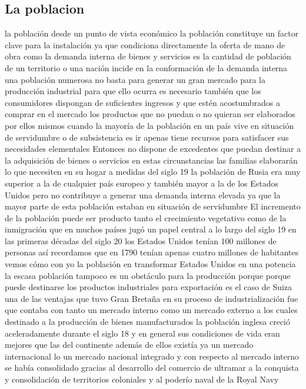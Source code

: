 \documentclass[12pt]{book}
\begin{document}
\subsection{La poblacion}
la población desde un punto de vista económico la población constituye un factor clave para la instalación ya que condiciona directamente la oferta de mano de obra como la demanda interna de bienes y servicios es la cantidad de población de un territorio o una nación incide en la conformación de la demanda interna una población numerosa no basta para generar un gran mercado para la producción industrial para que ello ocurra es necesario también que los consumidores dispongan de suficientes ingresos y que estén acostumbrados a comprar en el mercado los productos que no puedan o no quieran ser elaborados por ellos mismos cuando la mayoría de la población en un país vive en situación de servidumbre o de subsistencia es ir apenas tiene recursos para satisfacer sus necesidades elementales Entonces no dispone de excedentes que puedan destinar a la adquisición de bienes o servicios en estas circunstancias las familias elaborarán lo que necesiten en su hogar a medidas del siglo 19 la población de Rusia era muy superior a la de cualquier país europeo y también mayor a la de los Estados Unidos pero no contribuye a generar una demanda interna elevada ya que la mayor parte de esta población estaban en situación de servidumbre El incremento de la población puede ser producto tanto el crecimiento vegetativo como de la inmigración que en muchos países jugó un papel central a lo largo del siglo 19 en las primeras décadas del siglo 20 los Estados Unidos tenían 100 millones de personas así recordamos que en 1790 tenían apenas cuatro millones de habitantes vemos cómo con yo la población en transformar Estados Unidos en una potencia la escasa población tampoco es un obstáculo para la producción porque porque puede destinarse los productos industriales para exportación es el caso de Suiza una de las ventajas que tuvo Gran Bretaña en su proceso de industrialización fue que contaba con tanto un mercado interno como un mercado externo a los cuales destinado a la producción de bienes manufacturados la población inglesa creció aceleradamente durante el siglo 18 y en general sus condiciones de vida eran mejores que las del continente además de ellos existía ya un mercado internacional lo un mercado nacional integrado y con respecto al mercado interno se había consolidado gracias al desarrollo del comercio de ultramar a la conquista y consolidación de territorios coloniales y al poderío naval de la Royal Navy
\end{document}
